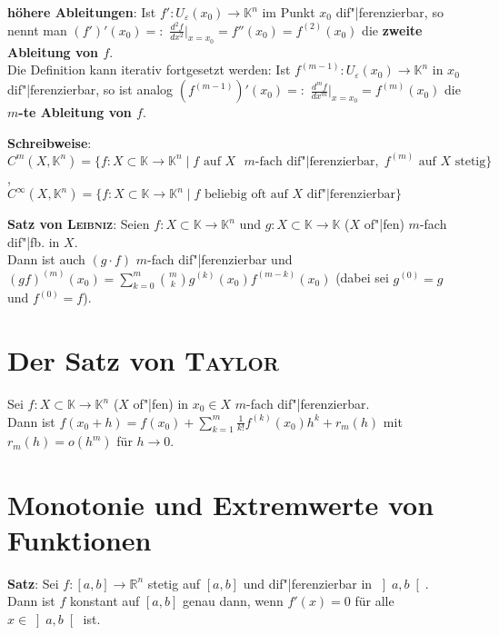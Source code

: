 \textbf{höhere Ableitungen}:
Ist $f': U_\varepsilon(x_0) \rightarrow \mathbb{K}^n$ im Punkt $x_0$
dif"|ferenzierbar, so nennt man
$(f')'(x_0) =:$ {\large $\frac{d^2 f}{dx^2}$}$\big|_{x=x_0} = f''(x_0) =
f^{(2)}(x_0)$ die \textbf{zweite Ableitung von $f$}. \\
Die Definition kann iterativ fortgesetzt werden:
Ist $f^{(m-1)}: U_\varepsilon(x_0) \rightarrow \mathbb{K}^n$ in $x_0$
dif"|ferenzierbar, so ist analog
$(f^{(m-1)})'(x_0) =:$ {\large $\frac{d^m f}{dx^m}$}$\big|_{x=x_0} =
f^{(m)}(x_0)$ die \textbf{$m$-te Ableitung von $f$}.

\textbf{Schreibweise}: \\
$C^m(X, \mathbb{K}^n) = \{f: X \subset \mathbb{K} \rightarrow \mathbb{K}^n
\;|\; f \text{ auf } X \text{ } m \text{-fach dif"|ferenzierbar},\;
f^{(m)} \text{ auf } X \text{ stetig}\}$, \\
$C^\infty(X, \mathbb{K}^n) = \{f: X \subset \mathbb{K} \rightarrow \mathbb{K}^n
\;|\; f \text{ beliebig oft auf } X \text{ dif"|ferenzierbar}\}$

\textbf{Satz von \textsc{Leibniz}}:
Seien $f: X \subset \mathbb{K} \rightarrow \mathbb{K}^n$ und
$g: X \subset \mathbb{K} \rightarrow \mathbb{K}$ ($X$ of"|fen)
$m$-fach dif"|fb. in $X$. \\
Dann ist auch $(g \cdot f)$ $m$-fach dif"|ferenzierbar und
$(gf)^{(m)}(x_0) = \sum_{k=0}^m \binom{m}{k} g^{(k)}(x_0) f^{(m-k)}(x_0)$
(dabei sei $g^{(0)} = g$ und $f^{(0)} = f$).

\section{%
    Der Satz von \textsc{Taylor}%
}

Sei $f: X \subset \mathbb{K} \rightarrow \mathbb{K}^n$ ($X$ of"|fen)
in $x_0 \in X$ $m$-fach dif"|ferenzierbar. \\
Dann ist $f(x_0 + h) = f(x_0) + \sum_{k=1}^m \frac{1}{k!} f^{(k)}(x_0) h^k +
r_m(h)$ mit $r_m(h) = o(h^m)$ für $h \to 0$.

\addtocounter{subsection}{1}
\section{%
    Monotonie und Extremwerte von Funktionen%
}

\textbf{Satz}:
Sei $f: [a,b] \rightarrow \mathbb{R}^n$ stetig auf $[a,b]$ und dif"|ferenzierbar
in $\left]a,b\right[$. \\
Dann ist $f$ konstant auf $[a,b]$ genau dann, wenn $f'(x) = 0$ für alle
$x \in \left]a,b\right[$ ist.

